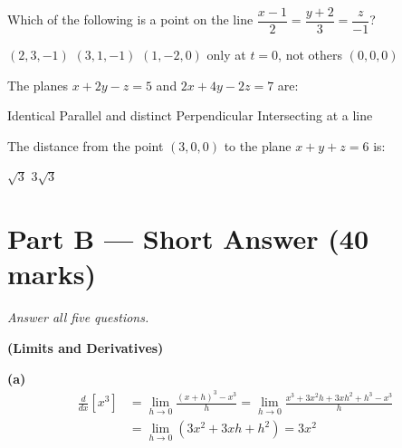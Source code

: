 \documentclass[addpoints]{exam}
\begin{document}
\begin{questions}
\question[1] Which of the following is a point on the line $\dfrac{x-1}{2}=\dfrac{y+2}{3}
=\dfrac{z}{-1}$?
\begin{choices}
    \choice $(2,3,-1)$
    \correctchoice $(3,1,-1)$
    \choice $(1,-2,0)$ only at $t=0$, not others
    \choice $(0,0,0)$
\end{choices}

\question[1] The planes $x + 2y - z = 5$ and $2x + 4y - 2z = 7$ are:
\begin{choices}
    \choice Identical
    \correctchoice Parallel and distinct
    \choice Perpendicular
    \choice Intersecting at a line
\end{choices}

\question[1] The distance from the point $(3,0,0)$ to the plane $x+y+z = 6$ is:
\begin{choices}
    \correctchoice $\sqrt{3}$
    \choice $3\sqrt{3}$
\end{choices}


\section*{Part B --- Short Answer (40 marks)}
\vspace{3mm}
\noindent\textit{Answer all five questions.}
\vspace{5mm}

\question \textbf{(Limits and Derivatives)}
\begin{solution}[10cm]
\textbf{(a)}
\begin{align*}
\frac{d}{dx}[x^3] &= \lim_{h\to 0}\frac{(x+h)^3 - x^3}{h}
= \lim_{h\to 0}\frac{x^3+3x^2h+3xh^2+h^3-x^3}{h} \\
&= \lim_{h\to 0}(3x^2+3xh+h^2) = \boxed{3x^2}
\end{align*}


\end{solution}
\end{questions}
\end{document}
